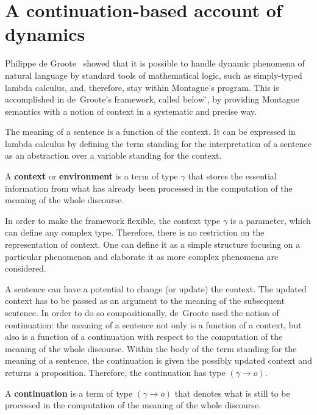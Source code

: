 \section{A continuation-based account of dynamics}

Philippe de Groote~\cite{deGroote:2006:Towards-a-Montagovian-Account-of-Dynamics} showed that it is possible to handle dynamic phenomena of natural language by standard tools of mathematical logic, such as simply-typed lambda calculus, and, therefore, stay within Montague's program. This is accomplished in de~Groote's framework, called below {\G}, by providing Montague semantics with a notion of context in a systematic and precise way. 

The meaning of a sentence is a function of the context. It can be expressed in lambda calculus by defining the term standing for the interpretation of a sentence as an abstraction over a variable standing for the context. 

\begin{definition} A \textbf{context} or \textbf{environment} is a term of type $\gamma$ that stores the essential information from what has already been processed in the computation of the meaning of the whole discourse.
\end{definition}

In order to make the framework flexible, the context type $\gamma$ is a parameter, which can define any complex type. Therefore, there is no restriction on the representation of context. One can define it as a simple structure focusing on a particular phenomenon and elaborate it as more complex phenomena are considered.

A sentence can have a potential to change (or update) the context. The updated context has to be passed as an argument to the meaning of the subsequent sentence. In order to do so compositionally, de~Groote used the notion of continuation: the meaning of a sentence not only is a function of a context, but also is a function of a continuation with respect to the computation of the meaning of the whole discourse. Within the body of the term standing for the meaning of a sentence, the continuation is given the possibly updated context and returns a proposition. Therefore, the continuation has type $(\gamma \rightarrow o)$.
\begin{definition}[Continuation] A \textbf{continuation} is a term of type $(\gamma \rightarrow o)$ that denotes what is still to be processed in the computation of the meaning of the whole discourse. 
\end{definition}

